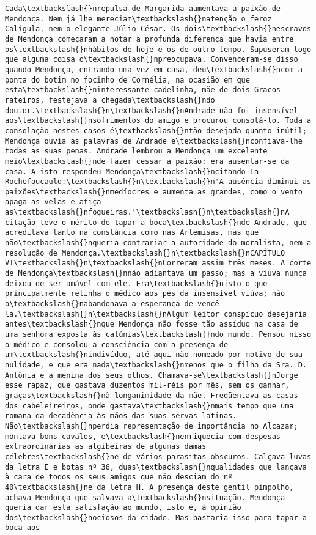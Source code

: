 \begin{Verbatim}[commandchars=\\\{\}]
Cada\textbackslash{}nrepulsa de Margarida aumentava a paixão de Mendonça. Nem já lhe mereciam\textbackslash{}natenção o feroz Calígula, nem o elegante Júlio César. Os dois\textbackslash{}nescravos de Mendonça começaram a notar a profunda diferença que havia entre os\textbackslash{}nhábitos de hoje e os de outro tempo. Supuseram logo que alguma coisa o\textbackslash{}npreocupava. Convenceram-se disso quando Mendonça, entrando uma vez em casa, deu\textbackslash{}ncom a ponta do botim no focinho de Cornélia, na ocasião em que esta\textbackslash{}ninteressante cadelinha, mãe de dois Gracos rateiros, festejava a chegada\textbackslash{}ndo doutor.\textbackslash{}n\textbackslash{}nAndrade não foi insensível aos\textbackslash{}nsofrimentos do amigo e procurou consolá-lo. Toda a consolação nestes casos é\textbackslash{}ntão desejada quanto inútil; Mendonça ouvia as palavras de Andrade e\textbackslash{}nconfiava-lhe todas as suas penas. Andrade lembrou a Mendonça um excelente meio\textbackslash{}nde fazer cessar a paixão: era ausentar-se da casa. A isto respondeu Mendonça\textbackslash{}ncitando La Rochefoucauld:\textbackslash{}n\textbackslash{}n'A ausência diminui as paixões\textbackslash{}nmedíocres e aumenta as grandes, como o vento apaga as velas e atiça as\textbackslash{}nfogueiras.'\textbackslash{}n\textbackslash{}nA citação teve o mérito de tapar a boca\textbackslash{}nde Andrade, que acreditava tanto na constância como nas Artemisas, mas que não\textbackslash{}nqueria contrariar a autoridade do moralista, nem a resolução de Mendonça.\textbackslash{}n\textbackslash{}nCAPÍTULO VI\textbackslash{}n\textbackslash{}nCorreram assim três meses. A corte de Mendonça\textbackslash{}nnão adiantava um passo; mas a viúva nunca deixou de ser amável com ele. Era\textbackslash{}nisto o que principalmente retinha o médico aos pés da insensível viúva; não o\textbackslash{}nabandonava a esperança de vencê-la.\textbackslash{}n\textbackslash{}nAlgum leitor conspícuo desejaria antes\textbackslash{}nque Mendonça não fosse tão assíduo na casa de uma senhora exposta às calúnias\textbackslash{}ndo mundo. Pensou nisso o médico e consolou a consciência com a presença de um\textbackslash{}nindivíduo, até aqui não nomeado por motivo de sua nulidade, e que era nada\textbackslash{}nmenos que o filho da Sra. D. Antônia e a menina dos seus olhos. Chamava-se\textbackslash{}nJorge esse rapaz, que gastava duzentos mil-réis por mês, sem os ganhar, graças\textbackslash{}nà longanimidade da mãe. Freqüentava as casas dos cabeleireiros, onde gastava\textbackslash{}nmais tempo que uma romana da decadência às mãos das suas servas latinas. Não\textbackslash{}nperdia representação de importância no Alcazar; montava bons cavalos, e\textbackslash{}nenriquecia com despesas extraordinárias as algibeiras de algumas damas célebres\textbackslash{}ne de vários parasitas obscuros. Calçava luvas da letra E e botas nº 36, duas\textbackslash{}nqualidades que lançava à cara de todos os seus amigos que não desciam do nº 40\textbackslash{}ne da letra H. A presença deste gentil pimpolho, achava Mendonça que salvava a\textbackslash{}nsituação. Mendonça queria dar esta satisfação ao mundo, isto é, à opinião dos\textbackslash{}nociosos da cidade. Mas bastaria isso para tapar a boca aos 
\end{Verbatim}
